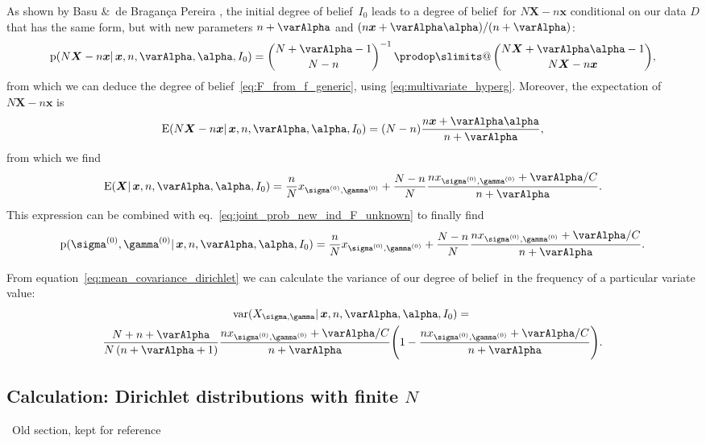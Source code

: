 \documentclass[\ifafour a4paper,12pt,\else a5paper,10pt,\fi%
onecolumn,oneside,article,%
british%
]{memoir}
\makeatletter
\theoremstyle{remark}
\theoremstyle{innote}
\def\prod{\DOTSI\prodop\slimits@}
\newcommand*{\citey}{\parencites*}
\newcommand*{\amp}{\&}
\newcommand*{\pf}{\mathrm{p}}%
\renewcommand*{\|}{\mathpunct{|}}
\newcommand*{\sect}{\S}%
\newcommand*{\eqn}{eq.}%
\newcommand*{\tprod}{\mathop{\textstyle\prod}\nolimits}
\newcommand*{\E}{\mathrm{E}}
\newcommand*{\puzzle}{\maltese}
\newcommand{\mynote}[1]{ {\color{notecolour}\puzzle\ #1}}
\DeclareMathOperator{\var}{var}
\newcommand*{\dob}{degree of belief}
\newcommand*{\yD}{D}
\newcommand*{\yprod}{\tprod}
\newcommand*{\ys}{\sigma}
\newcommand*{\yg}{\gamma}
\newcommand*{\ysi}[1]{\ys^{(#1)}}
\newcommand*{\ygi}[1]{\yg^{(#1)}}
\newcommand*{\yso}{\ysi{0}}
\newcommand*{\ygo}{\ygi{0}}
\newcommand*{\yF}{\bm{X}}
\newcommand*{\yf}{\bm{x}}
\newcommand*{\yIo}{I_{0}}
\newcommand*{\yA}{\varAlpha}
\newcommand*{\ya}{\bm{\alpha}}
\makeatother
\begin{document}
As shown by Basu \amp\ de Bragan\c{c}a Pereira \citey[\sect~4,
Theorem~2]{basuetal1982}, the initial \dob\ $\yIo$ leads to a \dob\ for
$N\yF-n\yf$ conditional on our data $\yD$ that has the same form, but with
new parameters $n+\yA$ and $(n\yf+\yA\ya)/(n+\yA)$:
\begin{equation}
  \label{eq:dirichlet_posterior_X}
  \pf(N\yF -n\yf \| \yf, n, \yA, \ya,\yIo) =
  \binom{N+\yA-1}{N-n}^{-1} \yprod\binom{N\yF+\yA\ya-1}{N\yF-n\yf},
\end{equation}
from which we can deduce the \dob~\eqref{eq:F_from_f_generic}, using
\eqref{eq:multivariate_hyperg}. Moreover, the expectation of $N\yF-n\yf$ is
\citey[\sect~3]{basuetal1982}
\begin{equation}
  \label{eq:dirichlet_posterior_expectation}
  \E(N\yF -n\yf \| \yf, n, \yA, \ya,\yIo) =
  (N-n) \frac{n\yf+\yA\ya}{n+\yA},
\end{equation}
from which we find
\begin{equation}
    \label{eq:expect_freq_dirichlet_prior_final}
    \E(\yF \| \yf, n,\yA,\ya, \yIo)  =
    \frac{n}{N}x_{\yso, \ygo} + \frac{N-n}{N}
\frac{n x_{\yso, \ygo}+\yA/C}{n+\yA}.
\end{equation}
This expression can be combined with
\eqn~\eqref{eq:joint_prob_new_ind_F_unknown} to finally find
\begin{equation}
    \label{eq:joint_prob_new_ind_full_dirichlet_prior_final}
    \pf(\yso, \ygo \| \yf, n,\yA,\ya, \yIo)  =
    \frac{n}{N}x_{\yso, \ygo} + \frac{N-n}{N}
\frac{n x_{\yso, \ygo}+\yA/C}{n+\yA}.
\end{equation}

From equation~\eqref{eq:mean_covariance_dirichlet} we can calculate the
variance of our \dob\ in the frequency of a particular variate value:
\begin{multline}
  \label{eq:variance_single_gene_dirichlet}
  \var(X_{\ys,\yg} \| \yf, n,\yA,\ya, \yIo)  ={}\\
  \frac{N+n+\yA}{N\,(n+\yA+1)}
  \frac{n x_{\yso, \ygo}+\yA/C}{n+\yA}
  \Biggl(1- \frac{n x_{\yso, \ygo}+\yA/C}{n+\yA} \Biggr).
\end{multline}


\subsection*{Calculation: Dirichlet distributions with finite $N$}

\mynote{Old section, kept for reference}
\end{document}

